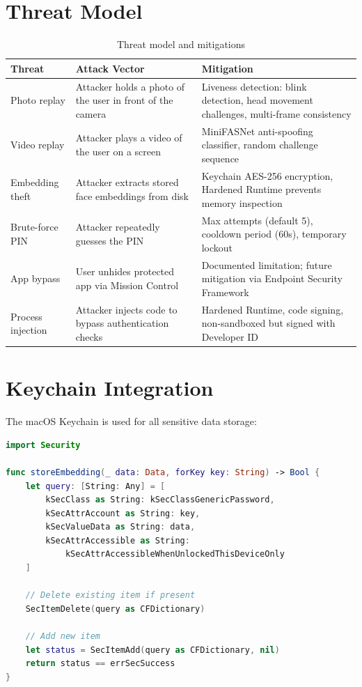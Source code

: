 \documentclass[12pt,a4paper]{report}
\begin{document}
\section{Threat Model}
\begin{table}[H]
\centering
\begin{tabularx}{\textwidth}{lXX}
\toprule
\textbf{Threat} & \textbf{Attack Vector} & \textbf{Mitigation} \\
\midrule
Photo replay & Attacker holds a photo of the user in front of the camera & Liveness detection: blink detection, head movement challenges, multi-frame consistency \\
Video replay & Attacker plays a video of the user on a screen & MiniFASNet anti-spoofing classifier, random challenge sequence \\
Embedding theft & Attacker extracts stored face embeddings from disk & Keychain AES-256 encryption, Hardened Runtime prevents memory inspection \\
Brute-force PIN & Attacker repeatedly guesses the PIN & Max attempts (default 5), cooldown period (60s), temporary lockout \\
App bypass & User unhides protected app via Mission Control & Documented limitation; future mitigation via Endpoint Security Framework \\
Process injection & Attacker injects code to bypass authentication checks & Hardened Runtime, code signing, non-sandboxed but signed with Developer ID \\
\bottomrule
\end{tabularx}
\caption{Threat model and mitigations}
\end{table}

\section{Keychain Integration}
The macOS Keychain is used for all sensitive data storage:

\begin{lstlisting}[language=Swift, caption={Keychain storage example}]
import Security

func storeEmbedding(_ data: Data, forKey key: String) -> Bool {
    let query: [String: Any] = [
        kSecClass as String: kSecClassGenericPassword,
        kSecAttrAccount as String: key,
        kSecValueData as String: data,
        kSecAttrAccessible as String:
            kSecAttrAccessibleWhenUnlockedThisDeviceOnly
    ]
    
    // Delete existing item if present
    SecItemDelete(query as CFDictionary)
    
    // Add new item
    let status = SecItemAdd(query as CFDictionary, nil)
    return status == errSecSuccess
}
\end{lstlisting}
\end{document}

